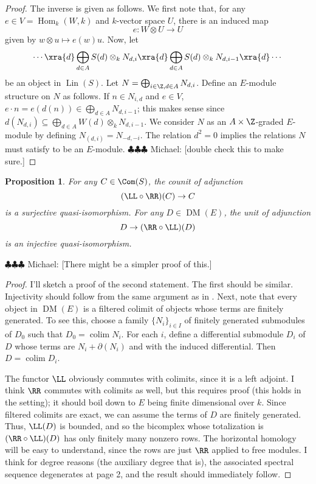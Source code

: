 \documentclass[12pt]{amsart}
\newtheorem{prop}[lemma]{Proposition}
\theoremstyle{definition}
\theoremstyle{remark}
\newcommand{\Hom}{\operatorname{Hom}} %
\newcommand{\michael}[1]{{\color{red} \sf $\clubsuit\clubsuit\clubsuit$ Michael: [#1]}}
\def\on{\operatorname}
\def\DM{\operatorname{DM}}
\begin{document}
\begin{proof}
The inverse is given as follows. We first note that, for any $e \in V = \Hom_k(W, k)$ and $k$-vector space $U$, there is an induced map
$$
e : W \otimes U \to U
$$
given by $w \otimes u \mapsto e(w)u$. Now, let
$$
\cdots \xra{d} \bigoplus_{d \in A}S(d)  \otimes_k N_{d,i}  \xra{d} \bigoplus_{d \in A} S(d) \otimes_k N_{d, i-1} \xra{d} \cdots
$$
be an object in $\on{Lin}(S)$. Let $N = \bigoplus_{i \in \Z, d \in A} N_{d, i}$. Define an $E$-module structure on $N$ as follows. If $n \in N_{i, d}$ and $e \in V$, $e \cdot n = e(d(n)) \in \bigoplus_{d \in A} N_{d, i-1}$; this makes sense since $d(N_{d, i}) \subseteq  \bigoplus_{d \in A} W(d) \otimes_k N_{d,i-1}$. We consider $N$ as an $A \times \Z$-graded $E$-module by defining $N_{(d, i)} = N_{-d, -i}$. The relation $d^2 = 0$ implies the relations $N$ must satisfy to be an $E$-module. \michael{double check this to make sure.}
\end{proof}

\begin{prop}
\label{resolutions}
For any $C \in \Com(S)$, the counit of adjunction
$$
(\LL \circ \RR)(C) \to C
$$
is a surjective quasi-isomorphism. For any $D \in \DM(E)$, the unit of adjunction
$$
D \to (\RR \circ \LL)(D)
$$
is an injective quasi-isomorphism.
\end{prop}

\michael{There might be a simpler proof of this.}

\begin{proof}
I'll sketch a proof of the second statement. The first should be similar. Injectivity should follow from the same argument as in \cite[Corollary 2.7]{EFS}. Next, note that every object in $\DM(E)$ is a filtered colimit of objects whose terms are finitely generated. To see this, choose a family $\{N_i\}_{i \in I}$ of finitely generated submodules of $D_0$ such that $D_0 = \on{colim} N_i$. For each $i$, define a differential submodule $D_i$ of $D$ whose terms are $N_i + \partial(N_i)$ and with the induced differential. Then $D = \on{colim} D_i$. 

The functor $\LL$ obviously commutes with colimits, since it is a left adjoint. I think $\RR$ commutes with colimits as well, but this requires proof (this holds in the \cite{EFS} setting); it should boil down to $E$ being finite dimensional over $k$. Since filtered colimits are exact, we can assume the terms of $D$ are finitely generated. Thus, $\LL(D)$ is bounded, and so the bicomplex whose totalization is $(\RR \circ \LL)(D)$ has only finitely many nonzero rows. The horizontal homology will be easy to understand, since the rows are just $\RR$ applied to free modules. I think for degree reasons (the auxiliary degree that is), the associated spectral sequence degenerates at page 2, and the result should immediately follow.

\end{proof}
\end{document}
